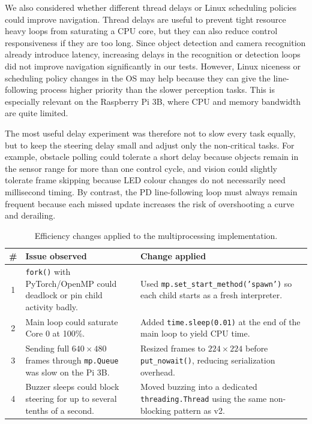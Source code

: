 \documentclass[10pt,a4paper]{article}
\begin{document}
We also considered whether different thread delays or Linux scheduling policies could improve navigation. Thread delays are useful to prevent tight resource heavy loops from saturating a CPU core, but they can also reduce control responsiveness if they are too long. Since object detection and camera recognition already introduce latency, increasing delays in the recognition or detection loops did not improve navigation significantly in our tests. However, Linux niceness or scheduling policy changes in the OS may help because they can give the line-following process higher priority than the slower perception tasks. This is especially relevant on the Raspberry Pi 3B, where CPU and memory bandwidth are quite limited.

The most useful delay experiment was therefore not to slow every task equally, but to keep the steering delay small and adjust only the non-critical tasks. For example, obstacle polling could tolerate a short delay because objects remain in the sensor range for more than one control cycle, and vision could slightly tolerate frame skipping because LED colour changes do not necessarily need millisecond timing. By contrast, the PD line-following loop must always remain frequent because each missed update increases the risk of overshooting a curve and derailing.

\begin{table}[htbp]
\centering
\small
\begin{tabularx}{\linewidth}{cX X}
\toprule
\# & Issue observed & Change applied \\
\midrule
1 & \texttt{fork()} with PyTorch/OpenMP could deadlock or pin child activity badly. & Used \texttt{mp.set\_start\_method('spawn')} so each child starts as a fresh interpreter. \\
2 & Main loop could saturate Core 0 at 100\%. & Added \texttt{time.sleep(0.01)} at the end of the main loop to yield CPU time. \\
3 & Sending full \(640\times480\) frames through \texttt{mp.Queue} was slow on the Pi 3B. & Resized frames to \(224\times224\) before \texttt{put\_nowait()}, reducing serialization overhead. \\
4 & Buzzer sleeps could block steering for up to several tenths of a second. & Moved buzzing into a dedicated \texttt{threading.Thread} using the same non-blocking pattern as v2. \\
\bottomrule
\end{tabularx}
\caption{Efficiency changes applied to the multiprocessing implementation.}
\end{table}
\end{document}
